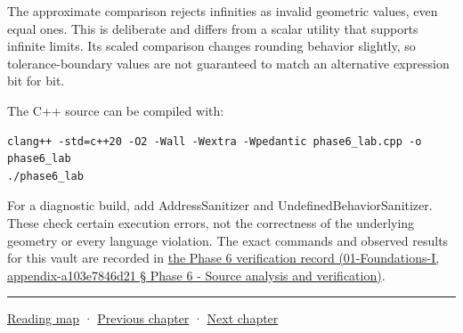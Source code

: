 The approximate comparison rejects infinities as invalid geometric values, even equal ones. This is deliberate and differs from a scalar utility that supports infinite limits. Its scaled comparison changes rounding behavior slightly, so tolerance-boundary values are not guaranteed to match an alternative expression bit for bit.

The C++ source can be compiled with:

\begin{verbatim}
clang++ -std=c++20 -O2 -Wall -Wextra -Wpedantic phase6_lab.cpp -o phase6_lab
./phase6_lab
\end{verbatim}

For a diagnostic build, add AddressSanitizer and UndefinedBehaviorSanitizer. These check certain execution errors, not the correctness of the underlying geometry or every language violation. The exact commands and observed results for this vault are recorded in \href{}{the Phase 6 verification record (01-Foundations-I, appendix-a103e7846d21 § Phase 6 - Source analysis and verification)}.

\begin{center}\rule{0.5\linewidth}{0.5pt}\end{center}

\href{Chapter\%20Edition/01\%20-\%20Computing\%20Foundations/00\%20-\%20Reading\%20Map}{Reading map} · \hyperref[02-foundations-ii-ch036]{Previous chapter} · \hyperref[02-foundations-ii-ch038]{Next chapter}
